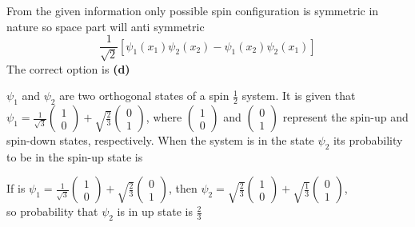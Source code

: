 \begin{enumerate}
\begin{tasks}
\end{tasks}
\begin{answer}
	 From the given information only possible spin configuration is symmetric in nature so space part will anti symmetric
	$$
	\frac{1}{\sqrt{2}}\left[\psi_{1}\left(x_{1}\right) \psi_{2}\left(x_{2}\right)-\psi_{1}\left(x_{2}\right) \psi_{2}\left(x_{1}\right)\right]
	$$
	The correct option is \textbf{(d)}
\end{answer}
\begin{minipage}{\textwidth}
	\item $\psi_{1}$ and $\psi_{2}$ are two orthogonal states of a spin $\frac{1}{2}$ system. It is given that
	$\psi_{1}=\frac{1}{\sqrt{3}}\left(\begin{array}{l}1 \\ 0\end{array}\right)+\sqrt{\frac{2}{3}}\left(\begin{array}{l}0 \\ 1\end{array}\right)$, where $\left(\begin{array}{l}1 \\ 0\end{array}\right)$ and $\left(\begin{array}{l}0 \\ 1\end{array}\right)$ represent the spin-up and spin-down states, respectively. When the system is in the state $\psi_{2}$ its probability to be in the spin-up state is
\end{minipage}
\begin{answer}
	If is $\psi_{1}=\frac{1}{\sqrt{3}}\left(\begin{array}{l}1 \\ 0\end{array}\right)+\sqrt{\frac{2}{3}}\left(\begin{array}{l}0 \\ 1\end{array}\right)$, then $\psi_{2}=\sqrt{\frac{2}{3}}\left(\begin{array}{l}1 \\ 0\end{array}\right)+\sqrt{\frac{1}{3}}\left(\begin{array}{l}0 \\ 1\end{array}\right)$,\\
	 so probability that $\psi_{2}$ is in up state is $\frac{2}{3}$
\end{answer}

\end{enumerate}
